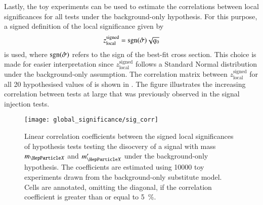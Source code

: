 Lastly, the toy experiments can be used to estimate the correlations between
local significances for all tests under the background-only hypothesis. For this
purpose, a signed definition of the local significance given by
\begin{align*}
  z_{\text{local}}^{\text{signed}} = \operatorname{sgn}(\hat{\sigma}) \sqrt{q_0}
\end{align*}
is used, where $\operatorname{sgn}(\hat{\sigma})$ refers to the sign of the best-fit cross
section. This choice is made for easier interpretation since
$z_{\text{local}}^{\text{signed}}$ follows a Standard Normal distribution under
the background-only assumption. The correlation matrix between
$z_{\text{local}}^{\text{signed}}$ for all 20 hypothesised values of \mX is
shown in . The figure illustrates the increasing correlation
between tests at large \mX that was previously observed in the signal injection
tests.

\begin{figure}[htbp]
  \centering

  \texttt{[image: global\_significance/sig\_corr]}

  \caption{Linear correlation coefficients between the signed local
    significances of hypothesis tests testing the disocvery of a signal with
    mass $\mX$ and $\mX^\prime$ under the background-only hypothesis. The
    coefficients are estimated using \num{10000} toy experiments drawn from the
    background-only substitute model. Cells are annotated, omitting the
    diagonal, if the correlation coefficient is greater than or equal to
    \SI{5}{\percent}.}%
  \label{fig:corr_sig}
\end{figure}



